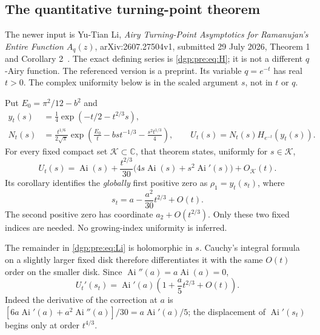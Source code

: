 \documentclass[11pt,letterpaper]{article}
\numberwithin{equation}{section}
\theoremstyle{remark}\newtheorem{remark}[theorem]{Remark}
\newcommand{\Ai}{\operatorname{Ai}}
\begin{document}
\subsection{The quantitative turning-point theorem}
The newer input is Yu-Tian Li, \emph{Airy Turning-Point Asymptotics for
Ramanujan's Entire Function $A_q(z)$}, arXiv:2607.27504v1, submitted
29 July 2026, Theorem 1 and Corollary 2~\cite{li}. The exact defining
series is \eqref{dgp:pre:eq:H}; it is not a different $q$-Airy function.
The referenced version is a preprint. Its variable $q=e^{-t}$ has real
$t>0$. The complex uniformity below is in the scaled argument $s$, not
in $t$ or $q$.

Put $E_0=\pi^2/12-b^2$ and
\begin{align}
 y_t(s)&=\frac14\exp(-t/2-t^{2/3}s),\label{dgp:pre:eq:y}\\
 N_t(s)&=\frac{t^{1/6}}{2\sqrt\pi}
  \exp\left(\frac{E_0}{t}-bs t^{-1/3}-\frac{s^2t^{1/3}}4\right),
 \qquad U_t(s)=N_t(s)H_{e^{-t}}(y_t(s)).\label{dgp:pre:eq:N}
\end{align}
For every fixed compact set $\mathcal K\subset\mathbb C$, that theorem
states, uniformly for $s\in\mathcal K$,
\begin{equation}
 U_t(s)=\Ai(s)+\frac{t^{2/3}}{30}
          \bigl(4s\Ai(s)+s^2\Ai'(s)\bigr)+O_{\mathcal K}(t).
 \label{dgp:pre:eq:Li}
\end{equation}
Its corollary identifies the \emph{globally} first positive zero as
$\rho_1=y_t(s_t)$, where
\begin{equation}
 s_t=a-\frac{a^2}{30}t^{2/3}+O(t).
 \label{dgp:pre:eq:zero}
\end{equation}
The second positive zero has coordinate $a_2+O(t^{2/3})$.
Only these two fixed indices are needed. No growing-index
uniformity is inferred.

The remainder in \eqref{dgp:pre:eq:Li} is holomorphic in $s$. Cauchy's integral
formula on a slightly larger fixed disk therefore differentiates it
with the same $O(t)$ order on the smaller disk. Since
$\Ai''(a)=a\Ai(a)=0$,
\begin{equation}
 U_t'(s_t)=\Ai'(a)\left(1+\frac a5 t^{2/3}+O(t)\right).
 \label{dgp:pre:eq:derivative}
\end{equation}
Indeed the derivative of the correction at $a$ is
$[6a\Ai'(a)+a^2\Ai''(a)]/30=a\Ai'(a)/5$; the displacement of
$\Ai'(s_t)$ begins only at order $t^{4/3}$.
\end{document}
